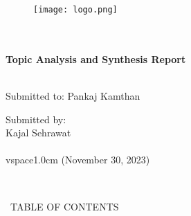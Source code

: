 \documentclass[a4paper,12pt]{article}
\begin{document}
\begin{titlepage}
   \begin{center}
        \vspace*{-8ex}
        \begin{figure}[h!]
  \raggedleft
  \texttt{[image: logo.png]} 
\end{figure}
       \\[0.3in]
       \\[0.3in]
\vspace{1.0cm}
       \textbf{\large Topic Analysis and Synthesis Report} \\ [0.3in]
         \\ [0.3in]
    

\vspace{3.0cm}
    
         {\centering Submitted to: Pankaj Kamthan\\[0.4in]}

\vspace{2.0cm}
    
        \centering Submitted by:\\[0.15in]
        {\centering Kajal Sehrawat\\}
        {\\}
vspace{1.0cm}
        {\centering (November 30, 2023)\\}
     
    \\[0.5in]
        
       \vfill
   \end{center}
\end{titlepage}

\renewcommand{\thesection}{\arabic{section}}
\ TABLE OF CONTENTS

\newpage
\end{document}
